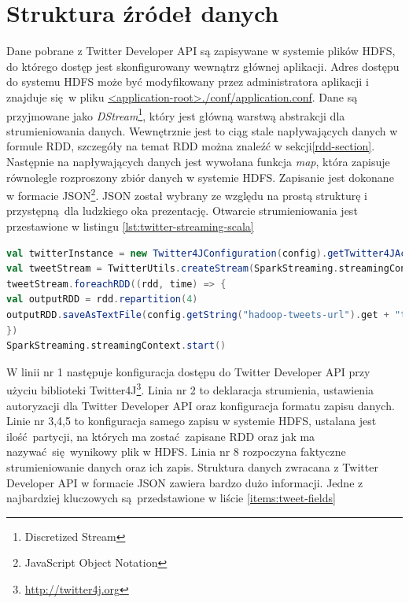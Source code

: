 \section{Struktura źródeł danych}\label{sec:tweet-structure}
Dane pobrane z Twitter Developer API są zapisywane w systemie plików HDFS, do którego dostęp jest skonfigurowany wewnątrz głównej aplikacji. Adres dostępu do systemu HDFS może być modyfikowany przez administratora aplikacji i znajduje się w pliku \url{<application-root>./conf/application.conf}. Dane są przyjmowane jako \textit{DStream}\footnote{Discretized Stream}, który jest główną warstwą abstrakcji dla strumieniowania danych. Wewnętrznie jest to ciąg stale napływających danych w formule RDD, szczegóły na temat RDD można znaleźć w sekcji\ref{rdd-section}. Następnie na napływających danych jest wywołana funkcja \textit{map}, która zapisuje równolegle rozproszony zbiór danych w systemie HDFS. Zapisanie jest dokonane w formacie JSON\footnote{JavaScript Object Notation}. JSON został wybrany ze względu na prostą strukturę i przystępną dla ludzkiego oka prezentację. Otwarcie strumieniowania jest przestawione w listingu \ref{lst:twitter-streaming-scala}  
\begin{lstlisting}[language=scala, caption={Otwarcie strumieniowania Twitter Developer API oraz zapis do HDFS},captionpos=b, label={lst:twitter-streaming-scala}]
val twitterInstance = new Twitter4JConfiguration(config).getTwitter4JAccess()
val tweetStream = TwitterUtils.createStream(SparkStreaming.streamingContext, Option(twitterInstance.getAuthorization)).map(new Gson().toJson(_))
tweetStream.foreachRDD((rdd, time) => {
val outputRDD = rdd.repartition(4)
outputRDD.saveAsTextFile(config.getString("hadoop-tweets-url").get + "tweet_" + time.milliseconds.toString)
})
SparkStreaming.streamingContext.start()
\end{lstlisting}
W linii nr 1 następuje konfiguracja dostępu do Twitter Developer API przy użyciu biblioteki Twitter4J\footnote{\url{http://twitter4j.org}}. Linia nr 2 to deklaracja strumienia, ustawienia autoryzacji dla Twitter Developer API oraz konfiguracja formatu zapisu danych. Linie nr 3,4,5 to konfiguracja samego zapisu w systemie HDFS, ustalana jest ilość partycji, na których ma zostać zapisane RDD oraz jak ma nazywać się wynikowy plik w HDFS. Linia nr 8 rozpoczyna faktyczne strumieniowanie danych oraz ich zapis.
\newline Struktura danych zwracana z Twitter Developer API w formacie JSON zawiera bardzo dużo informacji. Jedne z najbardziej kluczowych są przedstawione w liście \ref{items:tweet-fields}
